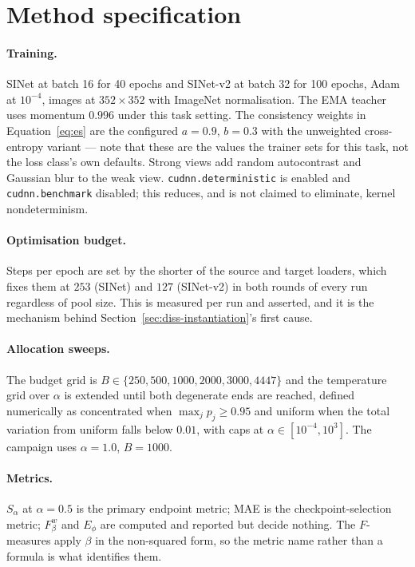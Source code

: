 \documentclass{article} %
\begin{document}
\appendix

\section{Method specification}
\label{app:method}

\paragraph{Training.} SINet at batch 16 for 40 epochs and SINet-v2 at batch 32 for 100 epochs, Adam at
$10^{-4}$, images at $352 \times 352$ with ImageNet normalisation. The EMA teacher uses momentum
$0.996$ under this task setting. The consistency weights in Equation~\ref{eq:es} are the configured
$a = 0.9$, $b = 0.3$ with the unweighted cross-entropy variant --- note that these are the values the
trainer sets for this task, not the loss class's own defaults. Strong views add random autocontrast
and Gaussian blur to the weak view. \texttt{cudnn.deterministic} is enabled and
\texttt{cudnn.benchmark} disabled; this reduces, and is not claimed to eliminate, kernel
nondeterminism.

\paragraph{Optimisation budget.} Steps per epoch are set by the shorter of the source and target
loaders, which fixes them at $253$ (SINet) and $127$ (SINet-v2) in both rounds of every run regardless
of pool size. This is measured per run and asserted, and it is the mechanism behind
Section~\ref{sec:diss-instantiation}'s first cause.

\paragraph{Allocation sweeps.} The budget grid is $B \in \{250, 500, 1000, 2000, 3000, 4447\}$ and the
temperature grid over $\alpha$ is extended until both degenerate ends are reached, defined numerically
as concentrated when $\max_j p_j \geq 0.95$ and uniform when the total variation from uniform falls
below $0.01$, with caps at $\alpha \in [10^{-4}, 10^{3}]$. The campaign uses $\alpha = 1.0$, $B = 1000$.

\paragraph{Metrics.} $S_\alpha$ at $\alpha = 0.5$ is the primary endpoint metric; MAE is the
checkpoint-selection metric; $F_\beta^w$ and $E_\phi$ are computed and reported but decide nothing.
The $F$-measures apply $\beta$ in the non-squared form, so the metric name rather than a formula is
what identifies them.
\end{document}
